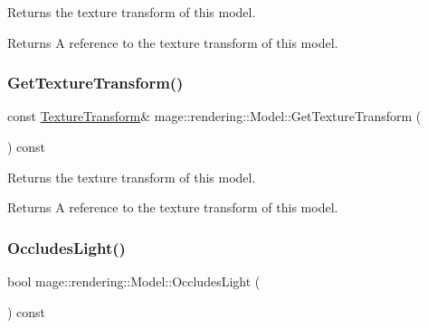 Returns the texture transform of this model.

\begin{DoxyReturn}{Returns}
A reference to the texture transform of this model. 
\end{DoxyReturn}
\mbox{\label{classmage_1_1rendering_1_1_model_adc18923fdb300d1eb753c9dcb9d30677}} 
\subsubsection{\texorpdfstring{Get\+Texture\+Transform()}{GetTextureTransform()}\hspace{0.1cm}{\footnotesize\ttfamily [2/2]}}
{\footnotesize\ttfamily const \mbox{\hyperlink{classmage_1_1_texture_transform}{Texture\+Transform}}\& mage\+::rendering\+::\+Model\+::\+Get\+Texture\+Transform (\begin{DoxyParamCaption}{ }\end{DoxyParamCaption}) const\hspace{0.3cm}{\ttfamily [noexcept]}}

Returns the texture transform of this model.

\begin{DoxyReturn}{Returns}
A reference to the texture transform of this model. 
\end{DoxyReturn}
\mbox{\label{classmage_1_1rendering_1_1_model_ac6238580ce9572b9274bf21852f73455}} 
\subsubsection{\texorpdfstring{Occludes\+Light()}{OccludesLight()}}
{\footnotesize\ttfamily bool mage\+::rendering\+::\+Model\+::\+Occludes\+Light (\begin{DoxyParamCaption}{ }\end{DoxyParamCaption}) const\hspace{0.3cm}{\ttfamily [noexcept]}}

